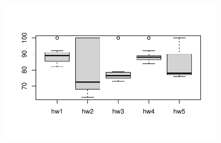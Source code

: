 \documentclass[
  letterpaper,
  DIV=11,
  numbers=noendperiod]{scrartcl}
\begin{document}
\begin{figure}[H]

{\centering \includegraphics{class6wksheetstuff!!!_files/figure-pdf/unnamed-chunk-21-1.pdf}

}

\end{figure}
\end{document}
